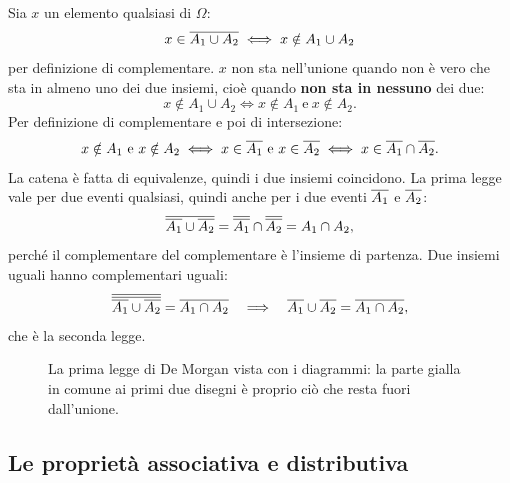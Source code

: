 \begin{dimostrazione}
 Sia $x$ un elemento qualsiasi di $\Omega$:
\[ x \in \overline{A_1 \cup A_2} \iff x \notin A_1 \cup A_2 \]
per definizione di complementare.
 $x$ non sta nell'unione quando non è vero che sta in almeno uno dei due insiemi, cioè quando
\textbf{non sta in nessuno} dei due:
\[ x \notin A_1 \cup A_2 \iff x \notin A_1 \ \text{e}\ x \notin A_2 . \]
 Per definizione di complementare e poi di intersezione:
\[ x \notin A_1 \ \text{e}\ x \notin A_2 \iff x \in \overline{A_1} \ \text{e}\ x \in \overline{A_2}
   \iff x \in \overline{A_1} \cap \overline{A_2} . \]
La catena è fatta di equivalenze, quindi i due insiemi coincidono.
 La prima legge vale per due eventi qualsiasi, quindi anche per i due
eventi $\overline{A_1}$ e $\overline{A_2}$:
\[ \overline{\overline{A_1} \cup \overline{A_2}} = \overline{\overline{A_1}} \cap \overline{\overline{A_2}} = A_1 \cap A_2 , \]
perché il complementare del complementare è l'insieme di partenza.
 Due insiemi uguali hanno complementari uguali:
\[ \overline{\overline{\overline{A_1} \cup \overline{A_2}}} = \overline{A_1 \cap A_2}
   \quad\Longrightarrow\quad \overline{A_1} \cup \overline{A_2} = \overline{A_1 \cap A_2} , \]
che è la seconda legge.
\end{dimostrazione}

\begin{figure}[H]
\centering
{}\hfill
{}\hfill
{}\hfill
{}
\caption{La prima legge di De Morgan vista con i diagrammi: la parte gialla in comune ai primi due disegni è proprio
ciò che resta fuori dall'unione.}
\end{figure}

\subsection{Le proprietà associativa e distributiva}


